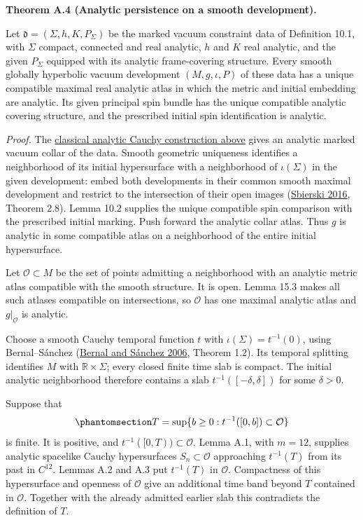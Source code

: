 \documentclass[
  english,
  11pt,
  reqno]{amsart}
\makeatletter
\newcommand{\pandocstatementheading}[1]{%
  \par\addpenalty{\@beginparpenalty}%
  \addvspace{.5\baselineskip plus .2\baselineskip minus .2\baselineskip}%
  {\normalfont\bfseries #1\par}%
  \nobreak\@afterindenttrue\@afterheading
}
\makeatother
\begin{document}
\pandocstatementheading{\protect{}\label{thm:compact-analytic-vacuum-persistence}Theorem A.4 (Analytic persistence on a smooth development).}

Let \(\mathfrak d=(\Sigma,h,K,P_\Sigma)\) be the marked vacuum
constraint data of Definition 10.1, with \(\Sigma\) compact, connected
and real analytic, \(h\) and \(K\) real analytic, and the given
\(P_\Sigma\) equipped with its analytic frame-covering structure. Every
smooth globally hyperbolic vacuum development \((M,g,\iota,P)\) of these
data has a unique compatible maximal real analytic atlas in which the
metric and initial embedding are analytic. Its given principal spin
bundle has the unique compatible analytic covering structure, and the
prescribed initial spin identification is analytic.

\emph{Proof.} The
\hyperref[sec:classical-analytic-cauchy-collars]{classical analytic
Cauchy construction above} gives an analytic marked vacuum collar of the
data. Smooth geometric uniqueness identifies a neighborhood of its
initial hypersurface with a neighborhood of \(\iota(\Sigma)\) in the
given development: embed both developments in their common smooth
maximal development and restrict to the intersection of their open
images (\hyperref[ref-Sbierski2016]{Sbierski 2016}, Theorem 2.8). Lemma
10.2 supplies the unique compatible spin comparison with the prescribed
initial marking. Push forward the analytic collar atlas. Thus \(g\) is
analytic in some compatible atlas on a neighborhood of the entire
initial hypersurface.

Let \(\mathcal O\subset M\) be the set of points admitting a
neighborhood with an analytic metric atlas compatible with the smooth
structure. It is open. Lemma 15.3 makes all such atlases compatible on
intersections, so \(\mathcal O\) has one maximal analytic atlas and
\(g|_{\mathcal O}\) is analytic.

Choose a smooth Cauchy temporal function \(t\) with
\(\iota(\Sigma)=t^{-1}(0)\), using Bernal--Sánchez
(\hyperref[ref-BernalSanchez2006]{Bernal and Sánchez 2006}, Theorem
1.2). Its temporal splitting identifies \(M\) with
\(\mathbb R\times\Sigma\); every closed finite time slab is compact. The
initial analytic neighborhood therefore contains a slab
\(t^{-1}([-\delta,\delta])\) for some \(\delta>0\).

Suppose that
\begin{equation}\protect\phantomsection\label{eq:analytic-persistence-first-slice}{
T=\sup\{b\ge0:t^{-1}([0,b])\subset\mathcal O\}
}\end{equation} is finite. It is positive, and
\(t^{-1}([0,T))\subset\mathcal O\). Lemma A.1, with \(m=12\), supplies
analytic spacelike Cauchy hypersurfaces \(S_n\subset\mathcal O\)
approaching \(t^{-1}(T)\) from its past in \(C^{12}\). Lemmas A.2 and
A.3 put \(t^{-1}(T)\) in \(\mathcal O\). Compactness of this
hypersurface and openness of \(\mathcal O\) give an additional time band
beyond \(T\) contained in \(\mathcal O\). Together with the already
admitted earlier slab this contradicts the definition of \(T\).
\end{document}
